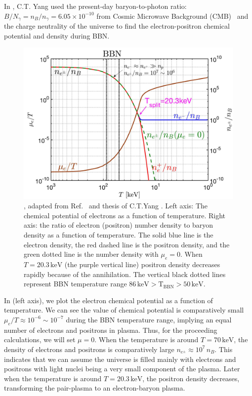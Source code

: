 In \cite{Grayson:2022asf}, C.T. Yang used the present-day baryon-to-photon ratio: $B/N_\gamma =n_B/n_\gamma= 6.05\times10^{-10}$ from Cosmic Microwave Background (CMB)~\cite{ParticleDataGroup:2022pth} and the charge neutrality of the universe to find the electron-positron chemical potential and density during BBN.
\begin{figure}[ht]
\begin{center}
\includegraphics[width=0.95\linewidth]{plots/chap03BBN/May152023_EPDensity_Chemical}
\caption{, adapted from Ref.~\cite{Grayson:2023flr} and thesis of C.T.Yang \cite{Yang:2024ret}. Left axis: The chemical potential of electrons as a function of temperature. Right axis: the ratio of electron (positron) number density to baryon density as a function of temperature. The solid blue line is the electron density, the red dashed line is the positron density, and the green dotted line is the number density with $\mu_e=0$. When $T=20.3\,\mathrm{keV}$ (the purple vertical line) positron density decreases rapidly because of the annihilation. The vertical black dotted lines represent BBN temperature range $86\,\mathrm{keV}>\mathrm{T_{BBN}}>50\,\mathrm{keV}$.}
\label{BBN_Electron}
\end{center}
\end{figure}

In  (left axis), we plot the electron chemical potential as a function of temperature. We can see the value of chemical potential is comparatively small $\mu_e/T\approx10^{-6}\sim10^{-7}$ during the BBN temperature range, implying an equal number of electrons and positrons in plasma. Thus, for the proceeding calculations, we will set $\mu =0$. When the temperature is around $T=70\,\mathrm{keV}$, the density of electrons and positrons is comparatively large $n_{e^\pm}\approx10^7\,n_B$. This indicates that we can assume the universe is filled mainly with electrons and positrons with light nuclei being a very small component of the plasma. Later when the temperature is around $T=20.3\,\mathrm{keV}$, the positron density decreases, transforming the pair-plasma to an electron-baryon plasma.


